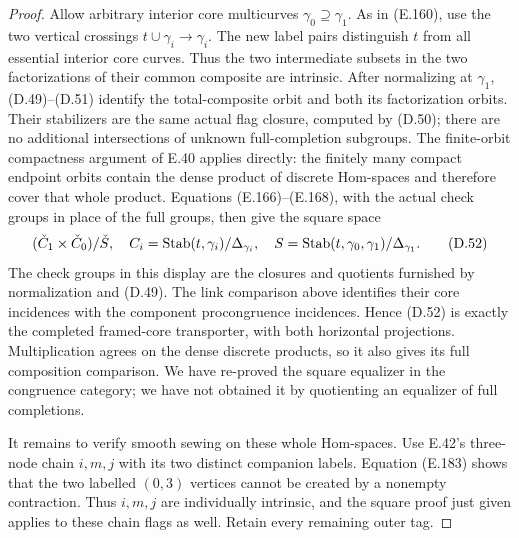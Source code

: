 \begin{proof}
Allow arbitrary interior core multicurves
$\gamma_0\supseteq\gamma_1$.  As in (E.160), use
the two vertical crossings
$t\cup\gamma_i\to\gamma_i$.
The new label pairs distinguish $t$ from all
essential interior core curves.  Thus the two
intermediate subsets in the two factorizations
of their common composite are intrinsic.
After normalizing at $\gamma_1$, (D.49)--(D.51)
identify the total-composite orbit and both its
factorization orbits.  Their stabilizers are the
same actual flag closure, computed by (D.50);
there are no additional intersections of unknown
full-completion subgroups.  The finite-orbit
compactness argument of E.40 applies directly:
the finitely many compact endpoint orbits contain
the dense product of discrete Hom-spaces and
therefore cover that whole product.  Equations
(E.166)--(E.168), with the actual check groups
in place of the full groups, then give the
square space
\[
       (\check C_1\times\check C_0)/\check S,
 \quad C_i=\operatorname{Stab}(t,\gamma_i)/\Delta_{\gamma_i},\quad
 S=\operatorname{Stab}(t,\gamma_0,\gamma_1)/\Delta_{\gamma_1}.              \tag{D.52}
\]
The check groups in this display are the closures
and quotients furnished by normalization and
(D.49).  The link comparison above identifies
their core incidences with the component
procongruence incidences.  Hence (D.52) is
exactly the completed framed-core transporter,
with both horizontal projections.  Multiplication
agrees on the dense discrete products, so it
also gives its full composition comparison.
We have re-proved the square equalizer in the
congruence category; we have not obtained it by
quotienting an equalizer of full completions.

It remains to verify smooth sewing on these
whole Hom-spaces.  Use E.42's three-node chain
$i,m,j$ with its two distinct companion labels.
Equation (E.183) shows that the two labelled
$(0,3)$ vertices cannot be created by a
nonempty contraction.  Thus $i,m,j$ are
individually intrinsic, and the square proof
just given applies to these chain flags as
well.  Retain every remaining outer tag.


\end{proof}
